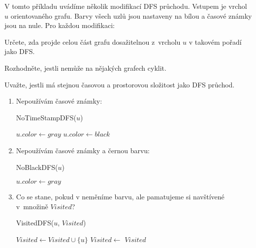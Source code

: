 \documentclass[12pt,a4paper]{extarticle}
\begin{document}
V tomto příkladu uvádíme několik modifikací DFS průchodu. Vstupem je vrchol $u$
orientovaného grafu. Barvy všech uzlů jsou nastaveny na bílou a časové známky
jsou na nule. Pro každou modifikaci:
\begin{compactitem}
	\item Určete, zda projde celou část grafu dosažitelnou z~vrcholu $u$ v takovém pořadí jako DFS.
	\item Rozhodněte, jestli nemůže na nějakých grafech cyklit.
	\item Uvažte, jestli má stejnou časovou a prostorovou složitost jako DFS průchod.
\end{compactitem}

\begin{enumerate}
	\item Nepoužívám časové známky:

	\begin{procedure}[H]
		\caption{NoTimeStampDFS($u$)}
		\BlankLine
		$\mathit{u.color} \leftarrow \mathit{gray}$ \;
		 {
			 {
				 \;
			}
		}
		$\mathit{u.color} \leftarrow \mathit{black}$ \;
	\end{procedure}

	\item Nepoužívám časové známky a černou barvu:
	
	\begin{procedure}[H]
		\caption{NoBlackDFS($u$)}
		\BlankLine
		$\mathit{u.color} \leftarrow \mathit{gray}$ \label{line:nobackdfs_first}\;
		 {
			 { \label{line:nobackdfs_fourth}
				 \;
			}
		}
	\end{procedure}


	\item Co se stane, pokud v \ffNoBlackDFS neměníme barvu, ale pamatujeme si navštívené v~množině $\mathit{Visited}$?
	
	\begin{procedure}[H]
		\caption{VisitedDFS($u$, $\mathit{Visited}$)}
		\BlankLine
		$\mathit{Visited} \leftarrow \mathit{Visited} \cup \{u\}$\;
		 {
			 {
				$\mathit{Visited} \leftarrow $ \;
			}
		}
		\Return $\mathit{Visited}$
	\end{procedure}
	

\end{enumerate}
\end{document}
